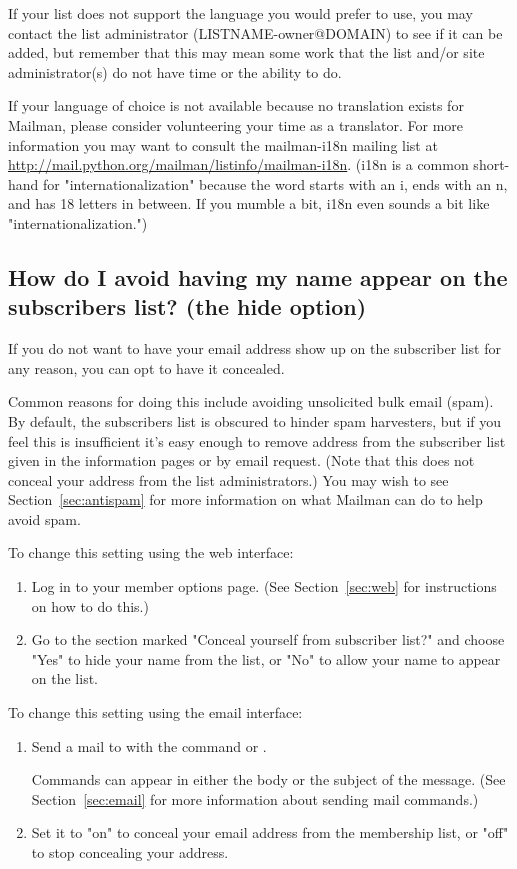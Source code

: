 \documentclass{howto}
\begin{document}
If your list does not support the language you would prefer to use, you may
contact the list administrator (LISTNAME-owner@DOMAIN) to see if it can be 
added, but remember that this may mean some work that the list and/or site 
administrator(s) do not have time or the ability to do.  

If your language of choice is not available because no translation
exists for Mailman, please consider volunteering your time as a translator.
For more information you may want to consult the mailman-i18n mailing 
list at \url{http://mail.python.org/mailman/listinfo/mailman-i18n}.
(i18n is a common short-hand for "internationalization" because the word starts 
with an i, ends with an n, and has 18 letters in between.  If you mumble a bit,
i18n even sounds a bit like "internationalization.")

\subsection{How do I avoid having my name appear on the subscribers list?
	(the hide option)\label{sec:nolist}}

If you do not want to have your email address show up on the subscriber list
for any reason, you can opt to have it concealed.

Common reasons for doing this include avoiding unsolicited bulk email (spam).  
By default, the subscribers list is obscured to hinder spam harvesters,
but if you feel this is insufficient it's easy enough to remove address
from the subscriber list given in the information pages or by email request.
(Note that this does not conceal your address from the list administrators.)
You may wish to see Section~\ref{sec:antispam} for more information on what
Mailman can do to help avoid spam.  

To change this setting using the web interface:
\begin{enumerate}
	\item Log in to your member options page.  (See Section~\ref{sec:web} for 
   instructions on how to do this.)
	\item Go to the section marked "Conceal yourself from subscriber list?" and
	choose "Yes" to hide your name from the list, or "No" to allow your name
	to appear on the list.
\end{enumerate}

To change this setting using the email interface:
\begin{enumerate} 
   \item Send a mail to  with the command
    or .

   Commands can appear 
   in either the body or the subject of the message.  (See
   Section~\ref{sec:email} for more information about sending mail
   commands.)
   \item Set it to "on" to conceal your email address from the membership
	list, or "off" to stop concealing your address.
\end{enumerate}
\end{document}
